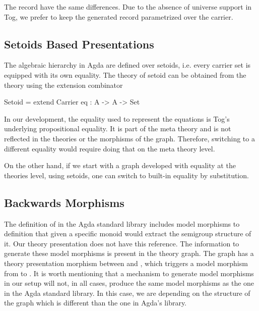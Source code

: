 The record  have the same differences. Due to the absence of universe support in Tog, we prefer to keep the generated  record parametrized over the carrier. 

\subsection{Setoids Based Presentations}
\label{subsec:setoid-based-pres}
The algebraic hierarchy in Agda are defined over setoids, i.e. every carrier set is equipped with its own equality. 
The theory of setoid can be obtained from the  theory using the extension combinator 
\begin{togcode}
Setoid = extend Carrier {eq : A -> A -> Set}
\end{togcode}
In our development, the equality used to represent the equations is Tog's underlying propositional equality. It is part of the meta theory and is not reflected in the theories or the morphisms of the graph. Therefore, switching to a different equality would require doing that on the meta theory level. 

On the other hand, if we start with a graph developed with equality at the theories level, using setoids, one can switch to built-in equality by substitution. 





\subsection{Backwards Morphisms} 
\label{subsec:model-morph}
\label{subsec:agda:modelMorphisms}
The definition of  in the Agda standard library includes model morphisms to   definition that given a specific monoid would extract the semigroup structure of it. Our theory presentation does not have this reference. The information to generate these model morphisms is present in the theory graph. The graph has a theory presentation morphism between  and , which triggers a model morphism from  to . It is worth mentioning that a mechanism to generate model morphisms in our setup will not, in all cases, produce the same model morphisms as the one in the Agda standard library. In this case, we are depending on the structure of the graph which is different than the one in Agda's library. 


